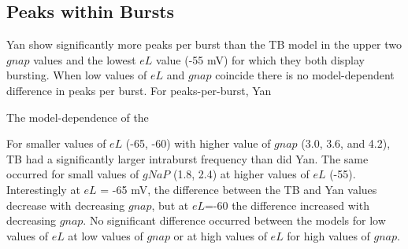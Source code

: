\documentclass[11pt]{article}
\begin{document}
\subsection{Peaks within Bursts}
Yan show significantly more peaks per burst than the TB model in the upper two $gnap$ values and the lowest $eL$ value (-55 mV) for which they both display bursting. When low values of $eL$ and $gnap$ coincide there is no model-dependent difference in peaks per burst.
For peaks-per-burst, Yan 

The model-dependence of the 

For smaller values of $eL$ (-65, -60) with higher value of $gnap$ (3.0, 3.6, and 4.2), TB had a significantly larger intraburst frequency than did Yan. The same occurred for small values of $gNaP$ (1.8, 2.4) at higher values of $eL$ (-55). Interestingly at $eL$ = -65 mV, the difference between the TB and Yan values decrease with decreasing $gnap$, but at $eL$=-60 the difference increased with decreasing $gnap$. No significant difference occurred between the models for low values of $eL$ at low values of $gnap$ or at high values of $eL$ for high values of $gnap$.
\end{document}
